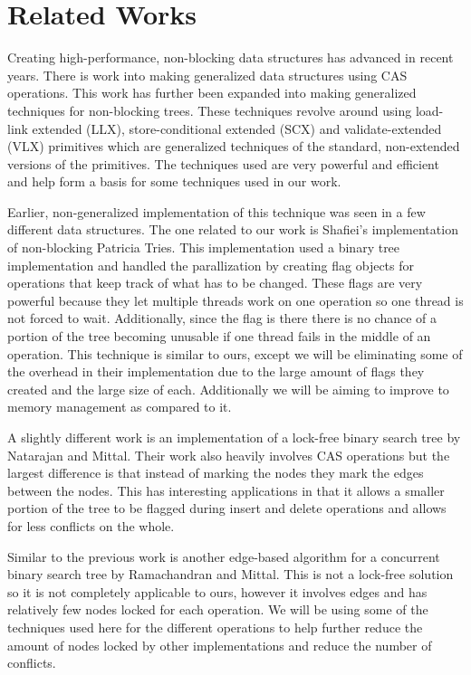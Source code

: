\documentclass[conference]{IEEEtran}
\begin{document}
\section{Related Works}
Creating high-performance, non-blocking data structures has advanced in recent years. There is work into making generalized data structures using CAS operations. \cite{Brown2013} This work has further been expanded into making generalized techniques for non-blocking trees. \cite{Brown2014} These techniques revolve around using load-link extended (LLX), store-conditional extended (SCX) and validate-extended (VLX) primitives which are generalized techniques of the standard, non-extended versions of the primitives. \cite{Brown2013, Brown2014} The techniques used are very powerful and efficient and help form a basis for some techniques used in our work.
\par
Earlier, non-generalized implementation of this technique was seen in a few different data structures. The one related to our work is Shafiei's implementation of non-blocking Patricia Tries. \cite{Shafiei2013} This implementation used a binary tree implementation and handled the parallization by creating flag objects for operations that keep track of what has to be changed. These flags are very powerful because they let multiple threads work on one operation so one thread is not forced to wait. Additionally, since the flag is there there is no chance of a portion of the tree becoming unusable if one thread fails in the middle of an operation. \cite{Shafiei2013, Howley2012} This technique is similar to ours, except we will be eliminating some of the overhead in their implementation due to the large amount of flags they created and the large size of each. Additionally we will be aiming to improve to memory management as compared to it.
\par
A slightly different work is an implementation of a lock-free binary search tree by Natarajan and Mittal. Their work also heavily involves CAS operations but the largest difference is that instead of marking the nodes they mark the edges between the nodes.\cite{Natarajan2014} This has interesting applications in that it allows a smaller portion of the tree to be flagged during insert and delete operations and allows for less conflicts on the whole.
\par
Similar to the previous work is another edge-based algorithm for a concurrent binary search tree by Ramachandran and Mittal. This is not a lock-free solution so it is not completely applicable to ours, however it involves edges and has relatively few nodes locked for each operation. \cite{Ramachandran2015} We will be using some of the techniques used here for the different operations to help further reduce the amount of nodes locked by other implementations and reduce the number of conflicts.
\end{document}
